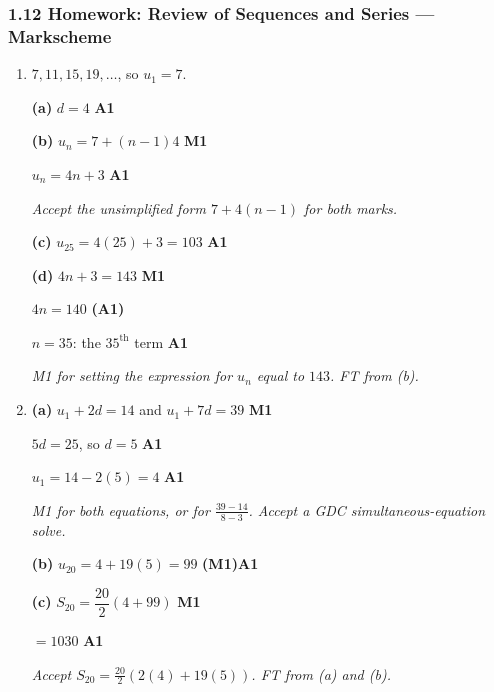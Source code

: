 \documentclass[12pt, twoside]{article}
\begin{document}
\subsubsection*{1.12 Homework: Review of Sequences and Series --- Markscheme}

\begin{enumerate}[itemsep=0.3cm]

\item[1.] [Maximum mark: 7]

$7, 11, 15, 19, \ldots$, so $u_{1} = 7$.

\textbf{(a)} $d = 4$ \hfill \textbf{A1}

\textbf{(b)} $u_{n} = 7 + (n - 1)4$ \hfill \textbf{M1}

$u_{n} = 4n + 3$ \hfill \textbf{A1}

\emph{Accept the unsimplified form $7 + 4(n - 1)$ for both marks.}

\textbf{(c)} $u_{25} = 4(25) + 3 = 103$ \hfill \textbf{A1}

\textbf{(d)} $4n + 3 = 143$ \hfill \textbf{M1}

$4n = 140$ \hfill \textbf{(A1)}

$n = 35$: the $35^{\text{th}}$ term \hfill \textbf{A1}

\emph{M1 for setting the expression for $u_{n}$ equal to $143$. FT from
(b).}

\medskip

\item[2.] [Maximum mark: 7]

\textbf{(a)} $u_{1} + 2d = 14$ and $u_{1} + 7d = 39$ \hfill \textbf{M1}

$5d = 25$, so $d = 5$ \hfill \textbf{A1}

$u_{1} = 14 - 2(5) = 4$ \hfill \textbf{A1}

\emph{M1 for both equations, or for $\frac{39 - 14}{8 - 3}$. Accept a GDC
simultaneous-equation solve.}

\textbf{(b)} $u_{20} = 4 + 19(5) = 99$ \hfill \textbf{(M1)A1}

\textbf{(c)} $S_{20} = \dfrac{20}{2}(4 + 99)$ \hfill \textbf{M1}

$= 1030$ \hfill \textbf{A1}

\emph{Accept $S_{20} = \frac{20}{2}\left(2(4) + 19(5)\right)$. FT from (a)
and (b).}

\newpage


\end{enumerate}
\end{document}
